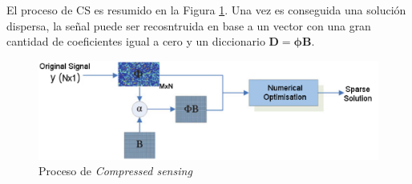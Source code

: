 El proceso de CS es resumido en la Figura \ref{fig:compressive}. Una vez es conseguida una soluci\'on dispersa, la se\~nal puede ser recosntruida en base a un vector con una gran cantidad de coeficientes igual a cero y un diccionario $\boldsymbol{D}=\boldsymbol{\phi B}$.
\begin{figure}[!h]
\centering
\includegraphics[width=\textwidth]{images/sparse.eps}
\caption[Proceso de \textit{Compressed sensing}]{Proceso de \textit{Compressed sensing} \cite{compressive}}
\label{fig:compressive}
\end{figure}











